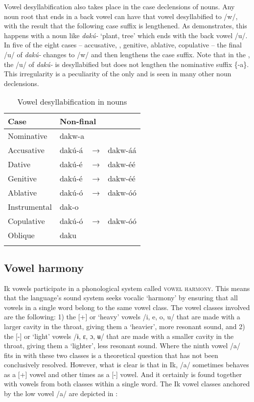 Vowel desyllabification also takes place in the case declensions of nouns. Any noun root that ends in a back vowel can have that vowel desyllabified to /w/, with the result that the following case suffix is lengthened. As  demonstrates, this happens with a noun like \textit{dakú-} ‘plant, tree’ which ends with the back vowel /u/. In five of the eight cases – accusative, , genitive, ablative, copulative – the final /u/ of \textit{dakú-} changes to /w/ and then lengthens the case suffix. Note that in the , the /u/ of \textit{dakú-} is desyllabified but does not lengthen the nominative suffix \{-a\}. This irregularity is a peculiarity of the  only and is seen in many other noun declensions.


\begin{table}
\caption{Vowel desyllabification in nouns}
\label{tab:phon:desyllabn}


\begin{tabularx}{\textwidth}{XXXX}
\lsptoprule

Case & \multicolumn{3}{X}{ Non-final}\\
\midrule
Nominative & dakw-a &  & \\
Accusative & dakú-á & → & dakw-áá\\
Dative & dakú-é & → & dakw-éé\\
Genitive & dakú-é & → & dakw-éé\\
Ablative & dakú-ó & → & dakw-óó\\
Instrumental & dak-o &  & \\
Copulative & dakú-ó & → & dakw-óó\\
Oblique & daku &  & \\
\lspbottomrule
\end{tabularx}
\end{table}

\subsection{Vowel harmony}\label{sec:2.5}


Ik vowels participate in a phonological system called \textsc{vowel harmony}. This means that the language’s sound system seeks vocalic ‘harmony’ by ensuring that all vowels in a single word belong to the same vowel class. The vowel classes involved are the following: 1) the [+] or ‘heavy’ vowels /i, e, o, u/ that are made with a larger cavity in the throat, giving them a ‘heavier’, more resonant sound, and 2) the [-] or ‘light’ vowels /ɨ, ɛ, ɔ, ʉ/ that are made with a smaller cavity in the throat, giving them a ‘lighter’, less resonant sound. Where the ninth vowel /a/ fits in with these two classes is a theoretical question that has not been conclusively resolved. However, what is clear is that in Ik, /a/ sometimes behaves as a [+] vowel and other times as a [-] vowel. And it certainly is found together with vowels from both classes within a single word. The Ik vowel classes anchored by the low vowel /a/ are depicted in :


